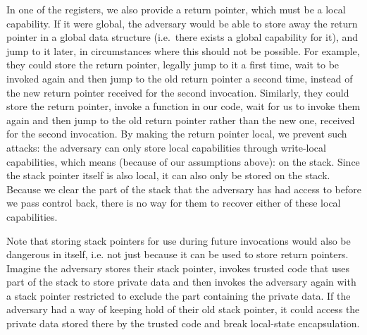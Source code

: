 \documentclass{llncs}
\newcommand{\sectionname}{Sec.}
\newcommand\lau[1]{{\color{purple} \sf \footnotesize {LS: #1}}\\}
\renewcommand\lau[1]{}
\begin{document}
In one of the registers, we also provide a return pointer, which must be a local
capability. If it were global, the adversary would be able to store away the
return pointer in a global data structure (i.e.\ there exists a global capability for it), and jump to it later, in
circumstances where this should not be possible. For example, they could store
the return pointer, legally jump to it a first time, wait to be invoked again
and then jump to the old return pointer a second time, instead of the new return
pointer received for the second invocation. Similarly, they could store the
return pointer, invoke a function in our code, wait for us to invoke them again
and then jump to the old return pointer rather than the new one, received for the
second invocation.
%
By making the return pointer local, we prevent such attacks: the adversary can
only store local capabilities through write-local capabilities, which means (because
of our assumptions above): on the stack. Since the stack pointer itself is
also local, it can also only be stored on the stack. Because we clear the part
of the stack that the adversary has had access to before we pass control back,
there is no way for them to recover either of these local capabilities.

Note that storing stack pointers for use during future invocations would also be
dangerous in itself, i.e. not just because it can be used to store return
pointers. Imagine the adversary stores their stack pointer, invokes trusted code
that uses part of the stack to store private data and then invokes the adversary
again with a stack pointer restricted to exclude the part containing the private
data. If the adversary had a way of keeping hold of their old stack pointer, it
could access the private data stored there by the trusted code and break
local-state encapsulation.  
\end{document}
